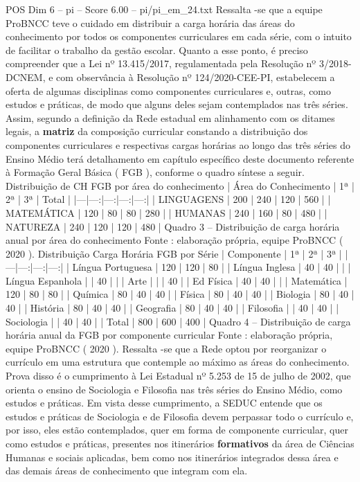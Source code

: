 \begin{textsample}{POS Dim 6 – pi – Score 6.00 – pi/pi\_em\_24.txt}
Ressalta -se que a equipe ProBNCC teve o cuidado em distribuir a carga horária das áreas do conhecimento por todos os componentes curriculares em cada série, com o intuito de facilitar o trabalho da gestão escolar.
Quanto a esse ponto, é preciso compreender que a Lei nº 13.415/2017, regulamentada pela Resolução nº 3/2018-DCNEM, e com observância à Resolução nº 124/2020-CEE-PI, estabelecem a oferta de algumas disciplinas como componentes curriculares e, outras, como estudos e práticas, de modo que alguns deles sejam contemplados nas três séries.
Assim, segundo a definição da Rede estadual em alinhamento com os ditames legais, a \textbf{matriz} da composição curricular constando a distribuição dos componentes curriculares e respectivas cargas horárias ao longo das três séries do Ensino Médio terá detalhamento em capítulo específico deste documento referente à Formação Geral Básica ( FGB ), conforme o quadro síntese a seguir.
Distribuição de CH FGB por área do conhecimento | Área do Conhecimento | 1ª | 2ª | 3ª | Total | |---|---:|---:|---:|---:| | LINGUAGENS | 200 | 240 | 120 | 560 | | MATEMÁTICA | 120 | 80 | 80 | 280 | | HUMANAS | 240 | 160 | 80 | 480 | | NATUREZA | 240 | 120 | 120 | 480 | Quadro 3 – Distribuição de carga horária anual por área do conhecimento Fonte : elaboração própria, equipe ProBNCC ( 2020 ).
Distribuição Carga Horária FGB por Série | Componente | 1ª | 2ª | 3ª | |---|---:|---:|---:| | Língua Portuguesa | 120 | 120 | 80 | | Língua Inglesa | 40 | 40 | | | Língua Espanhola | | 40 | | | Arte | | | 40 | | Ed Física | 40 | 40 | | | Matemática | 120 | 80 | 80 | | Química | 80 | 40 | 40 | | Física | 80 | 40 | 40 | | Biologia | 80 | 40 | 40 | | História | 80 | 40 | 40 | | Geografia | 80 | 40 | 40 | | Filosofia | | 40 | 40 | | Sociologia | | 40 | 40 | | Total | 800 | 600 | 400 | Quadro 4 – Distribuição de carga horária anual da FGB por componente curricular Fonte : elaboração própria, equipe ProBNCC ( 2020 ).
Ressalta -se que a Rede optou por reorganizar o currículo em uma estrutura que contemple ao máximo as áreas do conhecimento.
Prova disso é o cumprimento à Lei Estadual nº 5.253 de 15 de julho de 2002, que orienta o ensino de Sociologia e Filosofia nas três séries do Ensino Médio, como estudos e práticas.
Em vista desse cumprimento, a SEDUC entende que os estudos e práticas de Sociologia e de Filosofia devem perpassar todo o currículo e, por isso, eles estão contemplados, quer em forma de componente curricular, quer como estudos e práticas, presentes nos itinerários \textbf{formativos} da área de Ciências Humanas e sociais aplicadas, bem como nos itinerários integrados dessa área e das demais áreas de conhecimento que integram com ela.

\end{textsample}
